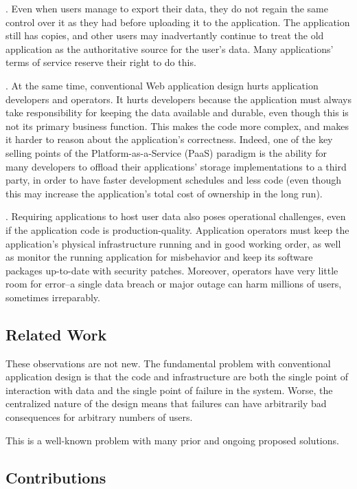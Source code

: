 .  Even when users manage to export their data, they do not regain the same control
over it as they had before uploading it to the application.  The application
still has copies, and other users may inadvertantly
continue to treat the old application as the authoritative source for the user's
data.  Many applications' terms of service reserve their right to do this.

.  At the same time, conventional Web
application design hurts application developers and operators.
It hurts developers because the application must always take 
responsibility for keeping the data available and durable, even though this is
not its primary business function.  This makes the code
more complex, and makes it harder to reason about the application's correctness.
Indeed, one of the key selling points of the Platform-as-a-Service (PaaS)
paradigm is the ability for many developers to offload their
applications' storage implementations to a third party, in order to have faster
development schedules and less code (even though this may increase the
application's total cost of ownership in the long run).

.  Requiring applications to host user data also poses operational challenges, even
if the application code is production-quality.  Application operators must keep the
application's physical infrastructure running and in
good working order, as well as monitor the running application for misbehavior and keep
its software packages up-to-date with security patches.  Moreover,
operators have very little room for error--a single data breach or major outage
can harm millions of users, sometimes irreparably.


\subsection{Related Work}

These observations are not new.  The fundamental problem with
conventional application design is that the code and infrastructure 
are both the single point of interaction with data and the single point of
failure in the system.  Worse, the centralized nature of the design
means that failures can have arbitrarily bad consequences for
arbitrary numbers of users.

This is a well-known problem with many prior and ongoing proposed solutions.  

\subsection{Contributions}

